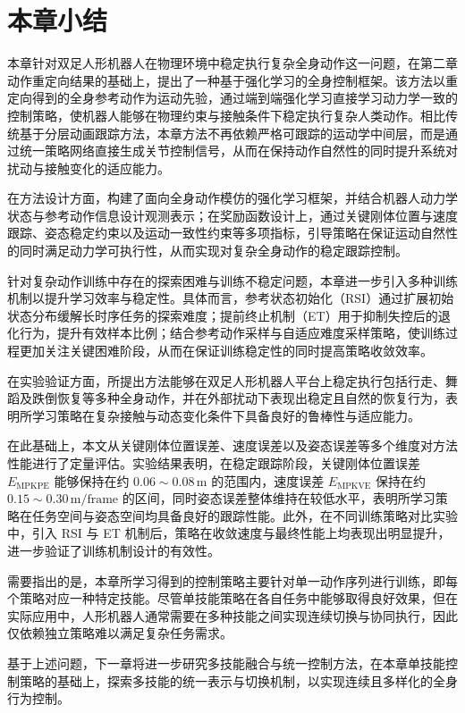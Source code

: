 \section{本章小结}

本章针对双足人形机器人在物理环境中稳定执行复杂全身动作这一问题，在第二章动作重定向结果的基础上，提出了一种基于强化学习的全身控制框架。该方法以重定向得到的全身参考动作为运动先验，通过端到端强化学习直接学习动力学一致的控制策略，使机器人能够在物理约束与接触条件下稳定执行复杂人类动作。相比传统基于分层动画跟踪方法，本章方法不再依赖严格可跟踪的运动学中间层，而是通过统一策略网络直接生成关节控制信号，从而在保持动作自然性的同时提升系统对扰动与接触变化的适应能力。

在方法设计方面，构建了面向全身动作模仿的强化学习框架，并结合机器人动力学状态与参考动作信息设计观测表示；在奖励函数设计上，通过关键刚体位置与速度跟踪、姿态稳定约束以及运动一致性约束等多项指标，引导策略在保证运动自然性的同时满足动力学可执行性，从而实现对复杂全身动作的稳定跟踪控制。

针对复杂动作训练中存在的探索困难与训练不稳定问题，本章进一步引入多种训练机制以提升学习效率与稳定性。具体而言，参考状态初始化（RSI）通过扩展初始状态分布缓解长时序任务的探索难度；提前终止机制（ET）用于抑制失控后的退化行为，提升有效样本比例；结合参考动作采样与自适应难度采样策略，使训练过程更加关注关键困难阶段，从而在保证训练稳定性的同时提高策略收敛效率。

在实验验证方面，所提出方法能够在双足人形机器人平台上稳定执行包括行走、舞蹈及跌倒恢复等多种全身动作，并在外部扰动下表现出稳定且自然的恢复行为，表明所学习策略在复杂接触与动态变化条件下具备良好的鲁棒性与适应能力。

在此基础上，本文从关键刚体位置误差、速度误差以及姿态误差等多个维度对方法性能进行了定量评估。实验结果表明，在稳定跟踪阶段，关键刚体位置误差 $E_{\mathrm{MPKPE}}$ 能够保持在约 $0.06\sim0.08\,\mathrm{m}$ 的范围内，速度误差 $E_{\mathrm{MPKVE}}$ 保持在约 $0.15\sim0.30\,\mathrm{m/frame}$ 的区间，同时姿态误差整体维持在较低水平，表明所学习策略在任务空间与姿态空间均具备良好的跟踪性能。此外，在不同训练策略对比实验中，引入 RSI 与 ET 机制后，策略在收敛速度与最终性能上均表现出明显提升，进一步验证了训练机制设计的有效性。

需要指出的是，本章所学习得到的控制策略主要针对单一动作序列进行训练，即每个策略对应一种特定技能。尽管单技能策略在各自任务中能够取得良好效果，但在实际应用中，人形机器人通常需要在多种技能之间实现连续切换与协同执行，因此仅依赖独立策略难以满足复杂任务需求。

基于上述问题，下一章将进一步研究多技能融合与统一控制方法，在本章单技能控制策略的基础上，探索多技能的统一表示与切换机制，以实现连续且多样化的全身行为控制。

